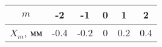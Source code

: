 \begin{table}[h!]
\centering
\begin{tabular}{|c|c|c|c|c|c|}
\hline
$m$       & -2   & -1   & 0 & 1   & 2   \\ \hline
$X_m$, мм & -0.4 & -0.2 & 0 & 0.2 & 0.4 \\ \hline
\end{tabular}
\caption{}
\end{table}
